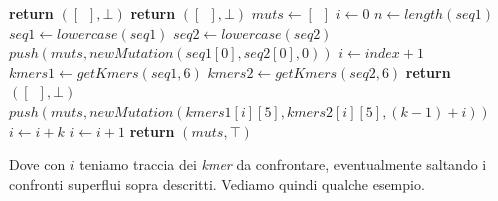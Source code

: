 \documentclass[a4paper,12pt, oneside]{book}
\begin{document}
\begin{algorithm}[H]
  \small
  \begin{algorithmic}
    \State \textbf{return} $([\,\,\,],\bot)$
    \EndIf
    \State \textbf{return} $([\,\,\,],\bot)$
    \EndIf
    \State $muts \gets [\,\,\,]$
    \State $i\gets 0$
    \State $n\gets length(seq1)$
    \State $seq1\gets lowercase(seq1)$
    \State $seq2\gets lowercase(seq2)$
    \State $push(muts, newMutation(seq1[0], seq2[0], 0))$
    \State $i \gets index+1$
    \EndIf
    \State $kmers1\gets getKmers(seq1,6)$
    \State $kmers2\gets getKmers(seq2,6)$
    \State \textbf{return} $([\,\,\,],\bot)$
    \EndIf
    \State $push(muts, newMutation(kmers1[i][5], kmers2[i][5], (k-1)+i))$
    \State $i\gets i+k$
    \Else
    \State $i\gets i+1$
    \EndIf
    \EndWhile
    \State \textbf{return} $(muts, \top)$
    \EndFunction
  \end{algorithmic}
  \caption{}
\end{algorithm}
Dove con $i$ teniamo traccia dei \textit{kmer} da confrontare, eventualmente
saltando i confronti superflui sopra descritti.
\newpage
Vediamo quindi qualche esempio.
\end{document}
